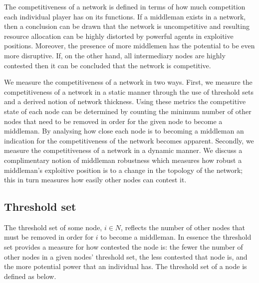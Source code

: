 The competitiveness of a network is defined in terms of how much competition each individual player has on its functions. If a middleman exists in a network, then a conclusion can be drawn that the network is uncompetitive and resulting resource allocation can be highly distorted by powerful agents in exploitive positions. Moreover, the presence of more middlemen has the potential to be even more disruptive. If, on the other hand, all intermediary nodes are highly contested then it can be concluded that the network is competitive.

We measure the competitiveness of a network in two ways. First, we measure the competitiveness of a network in a static manner through the use of threshold sets and a derived notion of network thickness. Using these metrics the competitive state of each node can be determined by counting the minimum number of other nodes that need to be removed in order for the given node to become a middleman. By analysing how close each node is to becoming a middleman an indication for the competitiveness of the network becomes apparent. Secondly, we measure the competitiveness of a network in a dynamic manner. We discuss a complimentary notion of middleman robustness which measures how robust a middleman's exploitive position is to a change in the topology of the network; this in turn measures how easily other nodes can contest it.

\subsection{Threshold set}

The threshold set of some node, $i \in N$, reflects the number of other nodes that must be removed in order for $i$ to become a middleman. In essence the threshold set provides a measure for how contested the node is: the fewer the number of other nodes in a given nodes' threshold set, the less contested that node is, and the more potential power that an individual has. The threshold set of a node is defined as below.

